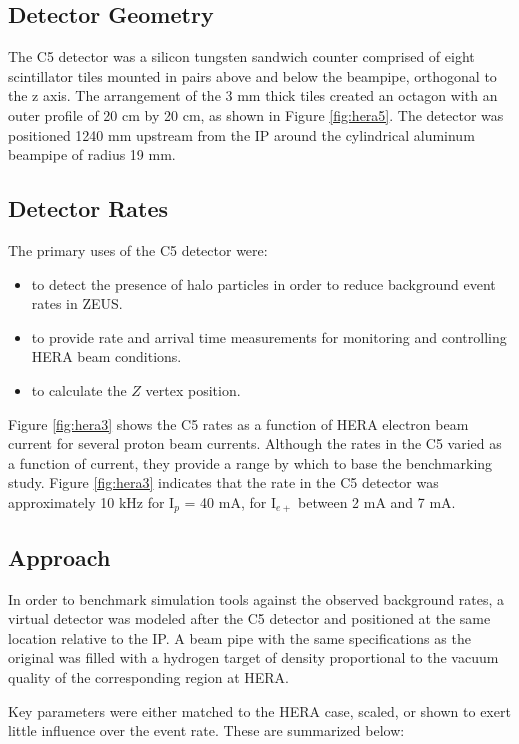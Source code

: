 \subsection{Detector Geometry}

The C5 detector was a silicon tungsten sandwich counter comprised of eight scintillator tiles mounted in pairs above and below the beampipe, orthogonal to the z axis.  The arrangement of the 3 mm thick tiles created an octagon with an outer profile of 20 cm by 20 cm, as shown in Figure \ref{fig:hera5}.  The detector was positioned 1240 mm upstream from the IP around the cylindrical aluminum beampipe of radius 19 mm.  

\subsection{Detector Rates}
The primary uses of the C5 detector were:
\begin{itemize}
	\item to detect the presence of halo particles in order to reduce background event rates in ZEUS.
	\item to provide rate and arrival time measurements for monitoring and controlling HERA beam conditions.
	\item to calculate the $Z$ vertex position.
\end{itemize}
Figure \ref{fig:hera3} shows the C5 rates as a function of HERA electron beam current for several proton beam currents.  Although the rates in the C5 varied as a function of current, they provide a range by which to base the benchmarking study.  Figure \ref{fig:hera3} indicates that the rate in the C5 detector was approximately 10 kHz for I$_{p}$ = 40 mA, for I$_{e+}$ between 2 mA and 7 mA. 

\subsection{Approach}

In order to benchmark simulation tools against the observed background rates, a virtual detector was modeled after the C5 detector and positioned at the same location relative to the IP.  A beam pipe with the same specifications as the original was filled with a hydrogen target of density proportional to the vacuum quality of the corresponding region at HERA.  

Key parameters were either matched to the HERA case, scaled, or shown to exert little influence over the event rate.  These are summarized below:

